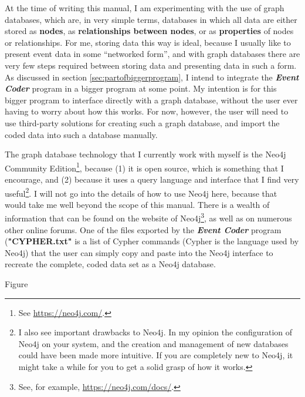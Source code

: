 \documentclass{memoir}
\begin{document}
At the time of writing this manual, I am experimenting with the use of graph databases, which are, in very simple terms, databases in which all data are either stored as \textbf{nodes}, as \textbf{relationships between nodes}, or as \textbf{properties} of nodes or relationships. For me, storing data this way is ideal, because I usually like to present event data in some ``networked form'', and with graph databases there are very few steps required between storing data and presenting data in such a form. As discussed in section \ref{sec:partofbiggerprogram}, I intend to integrate the \textbf{\emph{Event Coder}} program in a bigger program at some point. My intention is for this bigger program to interface directly with a graph database, without the user ever having to worry about how this works. For now, however, the user will need to use third-party solutions for creating such a graph database, and import the coded data into such a database manually.

The graph database technology that I currently work with myself is the Neo4j Community Edition\footnote{See \url{https://neo4j.com/}.}, because (1) it is open source, which is something that I encourage, and (2) because it uses a query language and interface that I find very useful\footnote{I also see important drawbacks to Neo4j. In my opinion the configuration of Neo4j on your system, and the creation and management of new databases could have been made more intuitive. If you are completely new to Neo4j, it might take a while for you to get a solid grasp of how it works.}. I will not go into the details of how to use Neo4j here, because that would take me well beyond the scope of this manual. There is a wealth of information that can be found on the website of Neo4j\footnote{See, for example, \url{https://neo4j.com/docs/}.}, as well as on numerous other online forums. One of the files exported by the \emph{\textbf{Event Coder}} program (\textbf{"CYPHER.txt"} is a list of Cypher commands (Cypher is the language used by Neo4j) that the user can simply copy and paste into the Neo4j interface to recreate the complete, coded data set as a Neo4j database.    

Figure %
\end{document}
